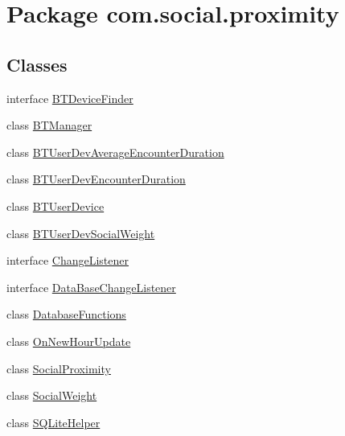 \hypertarget{namespacecom_1_1social_1_1proximity}{}\section{Package com.\+social.\+proximity}
\label{namespacecom_1_1social_1_1proximity}
\subsection*{Classes}
\begin{DoxyCompactItemize}
\item 
interface \hyperlink{interfacecom_1_1social_1_1proximity_1_1_b_t_device_finder}{B\+T\+Device\+Finder}
\item 
class \hyperlink{classcom_1_1social_1_1proximity_1_1_b_t_manager}{B\+T\+Manager}
\item 
class \hyperlink{classcom_1_1social_1_1proximity_1_1_b_t_user_dev_average_encounter_duration}{B\+T\+User\+Dev\+Average\+Encounter\+Duration}
\item 
class \hyperlink{classcom_1_1social_1_1proximity_1_1_b_t_user_dev_encounter_duration}{B\+T\+User\+Dev\+Encounter\+Duration}
\item 
class \hyperlink{classcom_1_1social_1_1proximity_1_1_b_t_user_device}{B\+T\+User\+Device}
\item 
class \hyperlink{classcom_1_1social_1_1proximity_1_1_b_t_user_dev_social_weight}{B\+T\+User\+Dev\+Social\+Weight}
\item 
interface \hyperlink{interfacecom_1_1social_1_1proximity_1_1_change_listener}{Change\+Listener}
\item 
interface \hyperlink{interfacecom_1_1social_1_1proximity_1_1_data_base_change_listener}{Data\+Base\+Change\+Listener}
\item 
class \hyperlink{classcom_1_1social_1_1proximity_1_1_database_functions}{Database\+Functions}
\item 
class \hyperlink{classcom_1_1social_1_1proximity_1_1_on_new_hour_update}{On\+New\+Hour\+Update}
\item 
class \hyperlink{classcom_1_1social_1_1proximity_1_1_social_proximity}{Social\+Proximity}
\item 
class \hyperlink{classcom_1_1social_1_1proximity_1_1_social_weight}{Social\+Weight}
\item 
class \hyperlink{classcom_1_1social_1_1proximity_1_1_s_q_lite_helper}{S\+Q\+Lite\+Helper}
\end{DoxyCompactItemize}



